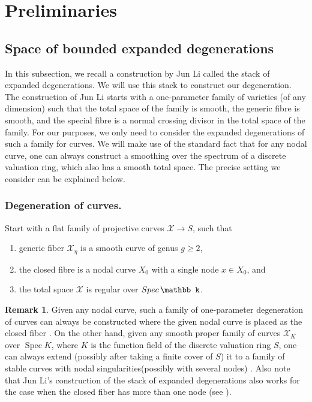 \documentclass[11pt]{amsart}
\DeclareMathOperator{\Spec}{Spec}
\theoremstyle{plain}
\numberwithin{equation}{section}
\newcommand{\spec}{{\rm Spec}\,}
\theoremstyle{definition}
\newtheorem{Rem}[Def]{Remark}
\theoremstyle{plain}
\begin{document}
\section{\textbf{Preliminaries}}

\subsection{\textbf{Space of bounded expanded degenerations}}
In this subsection, we recall a construction by Jun Li \cite{Li} called the stack of expanded degenerations. We will use this stack to construct our degeneration. The construction of Jun Li starts with a one-parameter family of varieties (of any dimension) such that the total space of the family is smooth, the generic fibre is smooth, and the special fibre is a normal crossing divisor in the total space of the family. For our purposes, we only need to consider the expanded degenerations of such a family for curves. We will make use of the standard fact that for any nodal curve, one can always construct a smoothing over the spectrum of a discrete valuation ring, which also has a smooth total space. The precise setting we consider can be explained below.


\subsubsection{\textbf{Degeneration of curves.}}\label{DegeCourbes} Start with a flat family of projective curves $\mathcal X\longrightarrow S$, such that 
\begin{enumerate}
\item generic fiber $\mathcal X_{\eta}$ is a smooth curve of genus $g\geq 2$, 
\item the closed fibre is a nodal curve $X_0$ with a single node $x \in X_{0}$, and
\item the total space $\mathcal X$ is regular over $\spec \mathbb k$. 
\end{enumerate}

\begin{Rem}
Given any nodal curve, such a family of one-parameter degeneration of curves can always be constructed where the given nodal curve is placed as the closed fiber \cite[Theorem B.2 and Corollary B.3, Appendix B]{M1}. On the other hand, given any smooth proper family of curves $\mathcal X_K$ over $\Spec K$, where $K$ is the function field of the discrete valuation ring $S$, one can always extend (possibly after taking a finite cover of $S$) it to a family of stable curves with nodal singularities(possibly with several nodes) \cite[Theorem 109.24.3.]{34}. Also note that Jun Li's construction of the stack of expanded degenerations also works for the case when the closed fiber has more than one node (see \cite[page 516]{Li}).   
\end{Rem}
\end{document}
